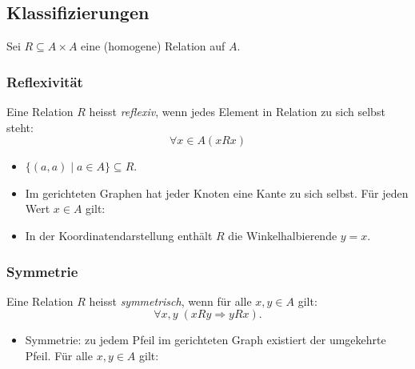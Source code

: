 \subsection{Klassifizierungen}

Sei \(R\subseteq A\times A\) eine (homogene) Relation auf \(A\).

\subsubsection{Reflexivität}
Eine Relation \(R\) heisst \emph{reflexiv}, wenn jedes Element in Relation zu sich selbst steht:
\[\forall x\in A(xRx)\]
\begin{itemize}
    \item \(\{(a,a)\mid a\in A\}\subseteq R\).
    \item Im gerichteten Graphen hat jeder Knoten eine Kante zu sich selbst. Für jeden Wert \(x\in A\) gilt:
    \item In der Koordinatendarstellung enthält \(R\) die Winkelhalbierende \(y=x\).
\end{itemize}

\subsubsection{Symmetrie}
Eine Relation \(R\) heisst \emph{symmetrisch}, wenn für alle \(x,y\in A\) gilt:
\[
  \forall x,y\;(xRy\Rightarrow yRx).
\]
\begin{itemize}
  \item Symmetrie: zu jedem Pfeil im gerichteten Graph existiert der umgekehrte Pfeil. Für alle \(x,y\in A\) gilt:\\
\end{itemize}


